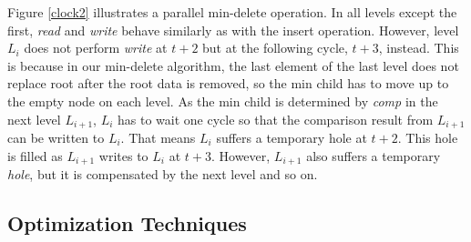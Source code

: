 Figure \ref{clock2} illustrates a parallel min-delete operation. 
In all levels except the first, {\it read} and {\it write} behave similarly as with the insert operation.
However, level $L_i$ does not perform {\it write} at $t+2$ but at the following cycle, $t+3$, instead.
This is because in our min-delete algorithm, the last element of the last level does not replace root after the root data is removed, so the min child has to move up to the empty node on each level.
As the min child is determined by {\it comp} in the next level $L_{i+1}$, $L_i$ has to wait one cycle so that the comparison result from $L_{i+1}$ can be written to $L_i$.
That means $L_i$ suffers a temporary hole at $t+2$.
This hole is filled as $L_{i+1}$ writes to $L_i$ at $t+3$.
However, $L_{i+1}$ also suffers a temporary {\it hole}, but it is compensated by the next level and so on.


\subsection{Optimization Techniques}
%

